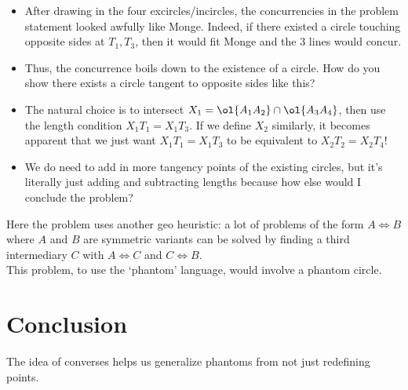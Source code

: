 \documentclass{seto}
\begin{document}
\begin{itemize}
\item After drawing in the four excircles/incircles, the concurrencies in the problem
statement looked awfully like Monge. Indeed, if there existed a circle touching opposite
sides at $T_1,T_3$, then it would fit Monge and the 3 lines would concur.
\item Thus, the concurrence boils down to the existence of a circle.
How do you show there exists a circle tangent to opposite sides like this?
\item The natural choice is to intersect $X_1=\ol{A_1A_2}\cap\ol{A_3A_4}$,
then use the length condition $X_1T_1=X_1T_3$.
If we define $X_2$ similarly, it becomes apparent that we just want $X_1T_1=X_1T_3$
to be equivalent to $X_2T_2=X_2T_4$!
\item We do need to add in more tangency points of the existing circles,
but it's literally just adding and subtracting lengths because 
how else would I conclude the problem?
\end{itemize}
Here the problem uses another geo heuristic: a lot of problems of the form $A\iff B$
where $A$ and $B$ are symmetric variants can be solved by finding a third intermediary $C$
with $A\iff C$ and $C\iff B$.\\
This problem, to use the `phantom' language, would involve a phantom circle. 
\section{Conclusion}
The idea of converses helps us generalize phantoms from not just redefining points.
\end{document}
